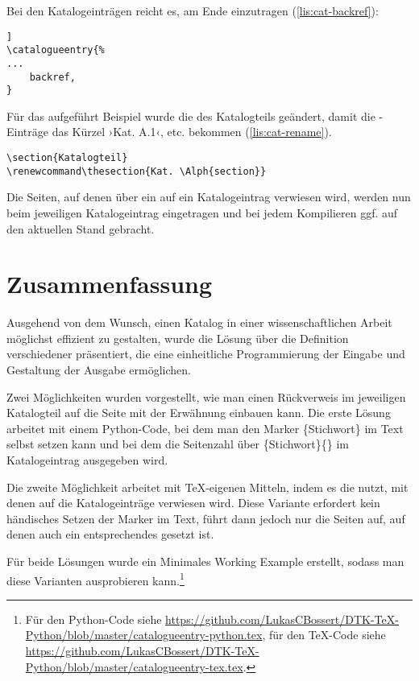 \documentclass[ngerman]{dtk}
\makeatletter
\newcommand\catalogueentry[1]{%
\RaggedRight\begingroup
\setkeys{catalogue}{#1}%
\ifdef{\KVhouse}{\section{\KVhouse
			\ifdef{\KVlabel}{\label{\KVlabel}}{}}
			}{}%
\begin{labeling}{Beschreibung}
\ifdef{\KVdescription}{\item[Beschreibung] \KVdescription}{}%
\ifdef{\KVlocation}{\item[Verortung] \KVlocation}{}%
\ifdef{\KVinterior}{%
	\item[Ausstattung] \KVinterior %
	\ifboolexpr{bool{@KVinteriorM} or bool {@KVinteriorW} or bool {@KVinteriorS}}{%
	\begin{labeling}{Wandgemälde}
			\ifdef{\KVinteriorM}{\item[Mosaike:] \KVinteriorM}{}
			\ifdef{\KVinteriorW}{\item[Wandgemälde:] \KVinteriorW}{}
			\ifdef{\KVinteriorS}{\item[Statuen:] \KVinteriorS}{}
			\end{labeling}
		}{}}%
	{%
	\ifboolexpr{bool{@KVinteriorM} or bool {@KVinteriorW} or bool {@KVinteriorS}}{%
		\item[Ausstattung]%
	\begin{labeling}{Wandgemälde}	
				\ifdef{\KVinteriorM}{\item[Mosaike:] \KVinteriorM}{}
				\ifdef{\KVinteriorW}{\item[Wandgemälde:] \KVinteriorW}{}
				\ifdef{\KVinteriorS}{\item[Statuen:] \KVinteriorS}{}
			\end{labeling}
	}{}}%
\ifdef{\KVsize}{	\item[Größe] \SI{\KVsize}{\meter\squared}}{}%
\ifdef{\KVbackref}{\item[Erwähnungen]S.\ \KVbackref}{}%
\end{labeling}
\endgroup
}
\makeatother
\begin{document}
Bei den Katalogeinträgen reicht es, am Ende  einzutragen (\cref{lis:cat-backref}):

\begin{lstlisting}[style=number,caption={Ergänzung im Katalogeeintrag},label={lis:cat-backref}]]
\catalogueentry{%
...
	backref,
}
\end{lstlisting}
Für das aufgeführt Beispiel %
wurde die  des Katalogteils geändert, damit die -Einträge das Kürzel ›Kat. A.1‹, etc. bekommen (\cref{lis:cat-rename}).
\begin{lstlisting}[style=number,caption={Modifkation der Namensgebung für Katalogeeinträge},label={lis:cat-rename}]
\section{Katalogteil}
\renewcommand\thesection{Kat. \Alph{section}}
\end{lstlisting}

Die Seiten, auf denen über ein   auf ein Katalogeintrag verwiesen wird,
werden nun beim jeweiligen Katalogeintrag eingetragen und bei jedem Kompilieren ggf. auf den aktuellen Stand gebracht.

\section{Zusammenfassung}
Ausgehend von dem Wunsch, einen Katalog in einer wissenschaftlichen Arbeit möglichst effizient zu gestalten, 
wurde die Lösung über die Definition verschiedener   präsentiert,
die eine einheitliche Programmierung der Eingabe und Gestaltung der Ausgabe ermöglichen.

Zwei Möglichkeiten wurden vorgestellt,
wie man einen Rückverweis im jeweiligen Katalogteil auf die Seite mit der Erwähnung einbauen kann.
Die erste Lösung arbeitet mit einem Python-Code, 
bei dem man den Marker \{Stichwort\} im Text selbst setzen kann und bei dem die Seitenzahl über 
\{Stichwort\}\{\} im Katalogeintrag ausgegeben wird.

Die zweite Möglichkeit arbeitet mit \TeX-eigenen Mitteln,
indem es die  nutzt, mit denen auf die Katalogeinträge verwiesen wird.
Diese Variante erfordert kein händisches Setzen der Marker im Text,
führt dann jedoch nur die Seiten auf, auf denen auch ein entsprechendes   gesetzt ist.

Für beide Lösungen wurde ein Minimales Working Example erstellt,
sodass man diese Varianten ausprobieren kann.\footnote{Für den Python-Code siehe
\url{https://github.com/LukasCBossert/DTK-TeX-Python/blob/master/catalogueentry-python.tex}, für den \TeX -Code siehe  
\url{https://github.com/LukasCBossert/DTK-TeX-Python/blob/master/catalogueentry-tex.tex}.}
\end{document}
